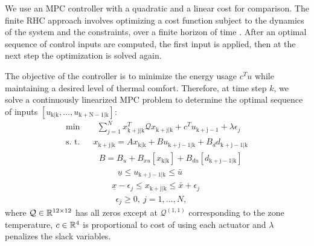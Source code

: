 We use an MPC controller with a quadratic and a linear cost for comparison.
The finite RHC approach involves optimizing a cost function subject to the dynamics of the system and the constraints, over a finite horizon of time \cite{Mayne2000}. After an optimal sequence of control inputs are computed, the first input is applied, then at the next step the optimization is solved again.


The objective of the controller is to minimize the energy usage $c^Tu$ while maintaining a desired level of thermal comfort.
Therefore, at time step $k$, we solve a continuously linearized MPC problem to determine the optimal sequence of inputs $[u_{\mathrm{k|k}},\dots,u_{\mathrm{k+N-1|k}}]$:
\begin{subequations}
\begin{align}
\text{min } & \ \ \ \ \sum_{j=1}^{N} {x}^T_{\mathrm{k+j|k}} \mathcal{Q} {x}_{\mathrm{k+j|k}} + c^Tu_{\mathrm{k+j-1}} +  \lambda\epsilon_j\\
\text{s.~t. } & \ \ x_{\mathrm{k+j|k}} =  Ax_{\mathrm{k|k}} + B u_{\mathrm{k+j-1|k}} + B_d d_{\mathrm{k+j-1|k}} \label{SE:mpc1} \\
& \ \ \ \ \ B = B_u + B_{xu}[x_{\mathrm{k|k}}] + B_{du}[d_{\mathrm{k+j-1|k}}] \label{SE:mpc2}\\
& \ \ \ \ \ \ \ \ \ \ \ \ \ \ \ \underline{u} \leq u_{\mathrm{k+j-1|k}} \leq \bar{u}\\ 
& \ \ \ \ \ \ \ \ \ \ \ \ \underline{x}-\epsilon_j \leq x_{\mathrm{k+j|k}} \leq \bar{x} + \epsilon_j\\\
& \ \ \ \ \ \ \ \ \ \ \ \ \ \ \epsilon_j \geq 0, \ j = 1,\dots,N,
\end{align}\label{E:mpc}
\end{subequations} 
\noindent where $\mathcal{Q} \in \mathbb{R}^{12 \times 12}$ has all zeros except at $\mathcal{Q}^{(1,1)}$ corresponding to the zone temperature, $c \in \mathbb{R}^{4}$ is proportional to cost of using each actuator and $\lambda$ penalizes the slack variables.
